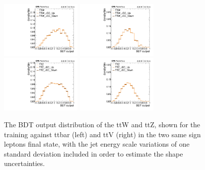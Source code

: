 \begin{figure}[htb]
	\centering 
\includegraphics[width=0.35\textwidth]{plots_irreduciblebkg/2lss/JEC_ttW/kinMVA_2lss_ttbar}
\includegraphics[width=0.35\textwidth]{plots_irreduciblebkg/2lss/JEC_ttW/kinMVA_2lss_ttV}
\includegraphics[width=0.35\textwidth]{plots_irreduciblebkg/2lss/JEC_ttZ/kinMVA_2lss_ttbar}
\includegraphics[width=0.35\textwidth]{plots_irreduciblebkg/2lss/JEC_ttZ/kinMVA_2lss_ttV}
	\caption{The BDT output distribution of the ttW and ttZ, shown for the training against ttbar 
	(left) and ttV (right) in the two same sign leptons final state, with the jet energy scale 
	variations of one standard deviation included in order to estimate the shape uncertainties.}
	\label{fig:TTVJEConBDTshape2lss}
\end{figure}

